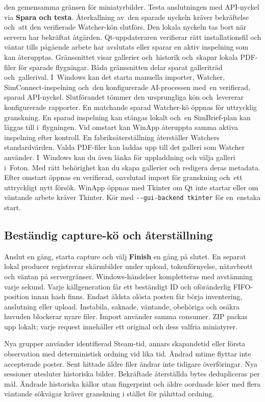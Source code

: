 \documentclass[11pt,a4paper]{article}
\newcommand{\ui}[1]{\textbf{#1}}
\newcommand{\codeword}[1]{\nolinkurl{#1}}
\begin{document}
den gemensamma gränsen för miniatyrbilder.
Testa anslutningen med API-nyckel via \ui{Spara och testa}.
Återkallning av~den sparade nyckeln kräver bekräftelse och~att den verifierade
Watcher-kön slutförs. Den lokala nyckeln tas bort när servern har bekräftat åtgärden.
Qt-uppdateraren verifierar rätt installationsfil och väntar tills pågående
arbete har avslutats eller sparar en aktiv inspelning som kan återupptas.
Gränssnittet visar gallerier
och~historik och~skapar lokala PDF-filer för sparade flygningar.
Båda gränssnitten delar sparat galleriträd och~gallerival.
I~Windows kan det starta manuella importer, Watcher, SimConnect-inspelning
och~den konfigurerade AI-processen med~en verifierad, sparad API-nyckel.
Slutförandet tömmer den ursprungliga kön och~levererar konfigurerade rapporter.
En matchande sparad Watcher-kö öppnas för uttrycklig granskning.
En sparad inspelning kan stängas lokalt och~en SimBrief-plan kan läggas till
i~flygningen.
Vid omstart kan WinApp återuppta samma aktiva inspelning efter kontroll.
En fabriksåterställning återställer Watchers standardvärden. Valda PDF-filer
kan laddas upp till det galleri som Watcher använder.
I~Windows kan du även länka för uppladdning och välja galleri i~Foton.
Med rätt behörighet kan du skapa gallerier och redigera deras metadata.
Efter omstart öppnas en verifierad, oavslutad import för granskning och~ett
uttryckligt nytt försök.
WinApp öppnas med Tkinter om Qt inte startar eller om väntande arbete
kräver Tkinter. Kör med \codeword{--gui-backend tkinter} för en~enstaka start.

\subsection{Beständig capture-kö och återställning}

Anslut en gång, starta capture och välj \ui{Finish} en gång på slutet.
En separat lokal producer registrerar skärmbilder under upload,
tokenförnyelse, nätavbrott och väntan på servergränser. Windows-händelser
kompletteras med avstämning varje sekund. Varje källgeneration får ett
beständigt ID och oföränderlig FIFO-position innan hash finns. Endast äldsta
olösta posten får börja inventering, anslutning eller upload. Instabila,
saknade, väntande, obehöriga och osäkra huvuden blockerar nyare filer.
Import använder samma consumer. ZIP packas upp lokalt; varje request
innehåller ett original och dess valfria miniatyrer.

Nya grupper använder identifierad Steam-tid, annars skapandetid eller första
observation med deterministisk ordning vid lika tid. Ändrad mtime flyttar
inte accepterade poster. Sent hittade äldre filer ändrar inte tidigare
överföringar. Nya sessioner utesluter historiska bilder. Bekräftade återställda
bytes dedupliceras per mål. Ändrade historiska källor utan fingerprint och
äldre oordnade köer med flera väntande sökvägar kräver granskning i stället
för påhittad ordning.
\end{document}

